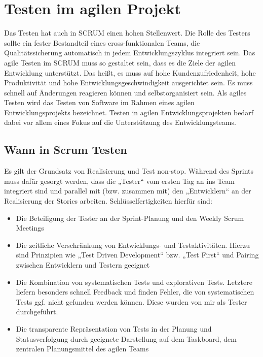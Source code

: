 \section{Testen im agilen Projekt}
\label{sec:testen_agil}

Das Testen hat auch in SCRUM einen hohen Stellenwert. Die Rolle des Testers sollte ein fester Bestandteil eines cross-funktionalen Teams, die Qualitätssicherung automatisch in jedem Entwicklungszyklus integriert sein. Das agile Testen im SCRUM muss so gestaltet sein, dass es die Ziele der agilen Entwicklung unterstützt. Das heißt, es muss auf hohe Kundenzufriedenheit, hohe Produktivität und hohe Entwicklungsgeschwindigkeit ausgerichtet sein. Es muss schnell auf Änderungen reagieren können und selbstorganisiert sein.
Als agiles Testen wird das Testen von Software im Rahmen eines agilen Entwicklungsprojekts bezeichnet. Testen in agilen Entwicklungsprojekten bedarf dabei vor allem eines Fokus auf die Unterstützung des Entwicklungsteams.


\subsection{Wann in Scrum Testen}
\label{sub:WannTestenScrum}

Es gilt der Grundsatz von Realisierung und Test non-stop. Während des Sprints muss dafür gesorgt werden, dass die „Tester“ vom ersten Tag an ins Team integriert sind und parallel mit (bzw. zusammen mit) den „Entwicklern“ an der Realisierung der Stories arbeiten. Schlüsselfertigkeiten hierfür sind:

\begin{itemize}
    \item Die Beteiligung der Tester an der Sprint-Planung und den Weekly Scrum Meetings
    \item Die zeitliche Verschränkung von Entwicklungs- und Testaktivitäten. Hierzu sind Prinzipien wie „Test Driven Development“ bzw. „Test First“ und Pairing zwischen Entwicklern und Testern geeignet
    \item Die Kombination von systematischen Tests und explorativen Tests. Letztere liefern besonders schnell Feedback und finden Fehler, die von systematischen Tests ggf. nicht gefunden werden können. Diese wurden von mir als Tester durchgeführt.
    \item Die transparente Repräsentation von Tests in der Planung und Statusverfolgung durch geeignete Darstellung auf dem Taskboard, dem zentralen Planungsmittel des agilen Teams
\end{itemize}

